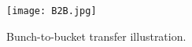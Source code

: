 %
%
%
\begin{figure}[H]
   \centering   
   \texttt{[image: B2B.jpg]}
   \caption{Bunch-to-bucket transfer illustration.}
   \label{B2B}
\end{figure}

